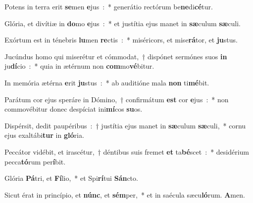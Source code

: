 ﻿\item Potens in terra erit \textbf{se}\-men \textbf{e}\-jus~:~* generátio rectórum be\textbf{ne}\-di\textbf{cé}\-tur.
\item Glória, et divítiæ in \textbf{do}\-mo \textbf{e}\-jus~:~* et justítia ejus manet in \textbf{sæ}\-culum \textbf{sæ}\-culi.
\item Exórtum est in ténebris \textbf{lu}\-men \textbf{re}\-ctis~:~* miséricors, et mise\textbf{rá}\-tor, et \textbf{ju}\-stus.
\item Jucúndus homo qui miserétur et cómmodat,~† dispónet sermónes suos \textbf{in} ju\textbf{dí}\-cio~:~* quia in ætérnum non \textbf{com}\-mo\textbf{vé}\-bitur.
\item In memória ætérna \textbf{e}\-rit \textbf{ju}\-stus~:~* ab auditióne mala \textbf{non} ti\textbf{mé}\-bit.
\item Parátum cor ejus speráre in Dómino,~† confirmátum \textbf{est} cor \textbf{e}\-jus~:~* non commovébitur donec despíciat ini\textbf{mí}\-cos \textbf{su}\-os.
\item Dispérsit, dedit paupéribus~:~† justítia ejus manet in \textbf{sæ}\-culum \textbf{sæ}\-culi,~* cornu ejus exaltábi\textbf{tur} in \textbf{gló}\-ria.
\item Peccátor vidébit, et irascétur,~† déntibus suis fremet \textbf{et} ta\textbf{bé}\-scet~:~* desidérium pecca\textbf{tó}\-rum per\textbf{í}\-bit.
\item Glória \textbf{Pá}\-tri, et \textbf{Fí}\-lio,~* et Spi\textbf{rí}\-tui \textbf{Sán}\-cto.
\item Sicut érat in princípio, et \textbf{núnc}, et \textbf{sém}\-per,~* et in saécula sæcu\textbf{ló}\-rum. \textbf{A}\-men.
